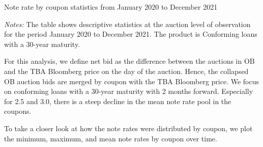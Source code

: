 \documentclass[11pt,a4paper]{article}
\begin{document}
\begin{table}[h]
  \centering
  
  \caption{Note rate by coupon statistics from January 2020 to December 2021 }
  \begin{minipage}{\textwidth}
      \footnotesize{\textit{Notes:} The table shows descriptive statistics at the auction level of observation for the period January 2020 to December 2021.
     The product is Conforming loans with a 30-year maturity. } 
      \end{minipage}
\end{table}


For this analysis, we define net bid as the difference between the auctions in OB and the TBA Bloomberg price on the day of the auction. Hence, the collapsed OB auction bids are merged by coupon with the TBA Bloomberg price. We focus on conforming loans with a 30-year maturity with 2 months forward. Especially for 2.5 and 3.0, there is a steep decline in the mean note rate pool in the coupons. 

To take a closer look at how the note rates were distributed by coupon, we plot the minimum, maximum, and mean note rates by coupon over time. 
\end{document}
